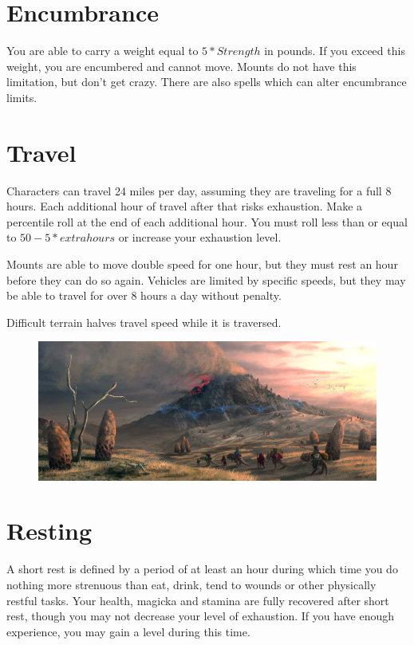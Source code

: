 \documentclass[12pt]{book}
\begin{document}
\section{Encumbrance}
You are able to carry a weight equal to $5*Strength$ in pounds. If you exceed this weight, you are encumbered and cannot move. Mounts do not have this limitation, but don't get crazy. There are also spells which can alter encumbrance limits.

\section{Travel}
Characters can travel 24 miles per day, assuming they are traveling for a full 8 hours. Each additional hour of travel after that risks exhaustion. Make a percentile roll at the end of each additional hour. You must roll less than or equal to $50-5*extra hours$ or increase your exhaustion level.

Mounts are able to move double speed for one hour, but they must rest an hour before they can do so again. Vehicles are limited by specific speeds, but they may be able to travel for over 8 hours a day without penalty.

Difficult terrain halves travel speed while it is traversed.

\begin{figure}[H]
	\includegraphics[width=\textwidth]{Morrowind.png}
\end{figure}

\section{Resting}
A short rest is defined by a period of at least an hour during which time you do nothing more strenuous than eat, drink, tend to wounds or other physically restful tasks. Your health, magicka and stamina are fully recovered after short rest, though you may not decrease your level of exhaustion. If you have enough experience, you may gain a level during this time.
\end{document}
